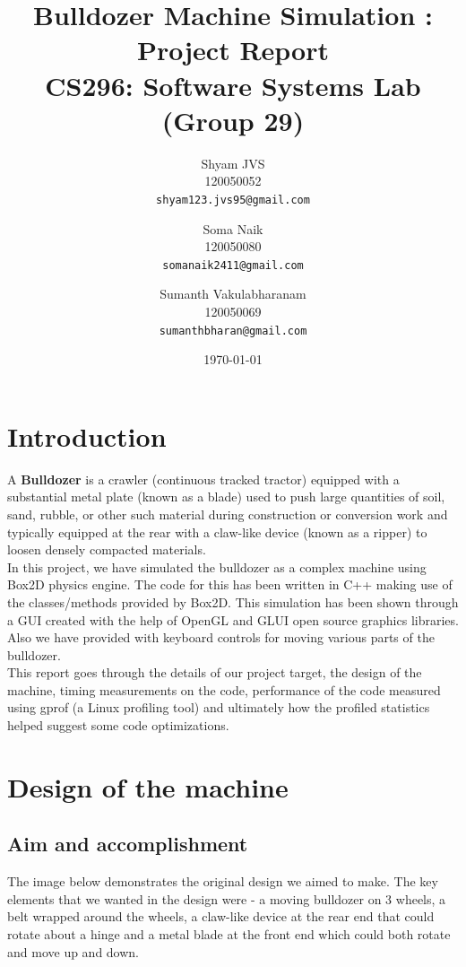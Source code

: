 \documentclass[11pt]{article}
\title{\textbf{Bulldozer Machine Simulation : Project Report} \\ CS296: Software Systems Lab (Group 29)}
\author{
  Shyam JVS\\
  120050052\\
  \texttt{shyam123.jvs95@gmail.com}
  \and
  Soma Naik\\
  120050080\\
  \texttt{somanaik2411@gmail.com}
  \and
  Sumanth Vakulabharanam\\
  120050069\\
  \texttt{sumanthbharan@gmail.com}\\
}
\date{\today}
\begin{document}

\maketitle

\section{Introduction}

A \textbf{Bulldozer} is a crawler (continuous tracked tractor) equipped
with a substantial metal plate (known as a blade) used to push large quantities of soil, sand, rubble, or other such material during construction or conversion work and typically equipped at the rear with a claw-like device (known as a ripper) to loosen densely compacted materials. \cite{wikipedia} \\
In this project, we have simulated the bulldozer as a complex machine using Box2D\cite{box2d} physics engine. The code for this has been written in C++ making use of the classes/methods provided by Box2D. This simulation has been shown through a GUI created with the help of OpenGL and GLUI open source graphics libraries. Also we have provided with keyboard controls for moving various parts of the bulldozer. \\
This report goes through the details of our project target, the design of the machine, timing measurements on the code, performance of the code measured using gprof (a Linux profiling tool) and ultimately how the profiled statistics helped suggest some code optimizations. 

\section{Design of the machine}

\subsection{Aim and accomplishment}
The image below demonstrates the original design we aimed to make. The key elements that we wanted in the design were - a moving bulldozer on 3 wheels, a belt wrapped around the wheels, a claw-like device at the rear end that could rotate about a hinge and a metal blade at the front end which could both rotate and move up and down. 
\end{document}
